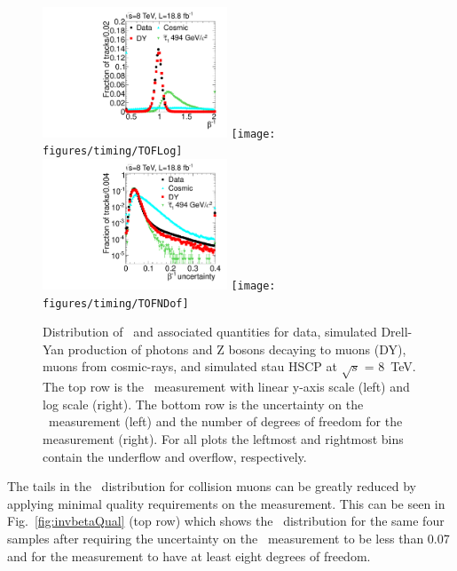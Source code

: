 \begin{figure}
  \begin{center}
      \includegraphics[width=0.49\textwidth]{figures/timing/TOF}
      \texttt{[image: figures/timing/TOFLog]} \\
      \includegraphics[width=0.49\textwidth]{figures/timing/TOFErr}
      \texttt{[image: figures/timing/TOFNDof]} \\
      \caption[Distribution of \invbeta\ and associated quantities.]
      {Distribution of \invbeta\ and associated quantities for data,
simulated Drell-Yan production of photons and Z bosons decaying to muons (DY), muons from cosmic-rays, and simulated stau HSCP at $\sqrt{s}$ = 8~TeV.
The top row is the \invbeta\ measurement with linear y-axis scale (left) and log scale (right).
The bottom row is the uncertainty on the \invbeta\ measurement (left) and the number of degrees of freedom for the measurement (right).
For all plots the leftmost and rightmost bins contain the underflow and overflow, respectively.
        }
      \label{fig:invbeta}
  \end{center}
\end{figure}

The tails in the \invbeta\ distribution for collision muons can be greatly reduced by applying minimal quality requirements on the measurement.
This can be seen in Fig.~\ref{fig:invbetaQual} (top row) which shows the \invbeta\ distribution for the same
four samples after requiring the uncertainty on the \invbeta\ measurement
to be less than 0.07 and for the measurement to have at least eight degrees of freedom.

